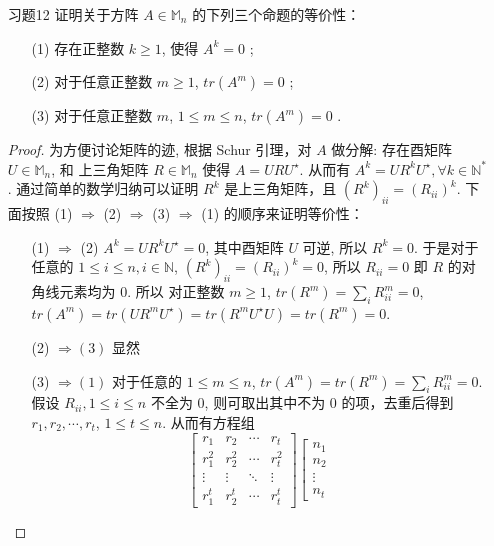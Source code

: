 \documentclass{article}
\begin{document}
\begin{spacing}{1.5}
\begin{enumerate}
\begin{itemize}
    \end{itemize}

    \item [习题12] 证明关于方阵 $A\in\mathbb{M}_n$ 的下列三个命题的等价性：
    \begin{itemize}
        \item [(1)] 存在正整数 $k \geq 1$, 使得 $A^k = 0$ ;
        \item [(2)] 对于任意正整数 $m\geq 1$, $tr(A^m) = 0$ ;
        \item [(3)] 对于任意正整数 $m$, $1\leq m \leq n$, $tr(A^m) = 0$ .
    \end{itemize}
    \begin{proof}
        为方便讨论矩阵的迹, 根据 Schur 引理，对 $A$ 做分解: 存在酉矩阵 $U\in\mathbb{M}_n$, 和 上三角矩阵 $R\in\mathbb{M}_n$ 使得 $A = URU^\star$. 从而有 $A^k = UR^kU^\star, \forall k\in\mathbb{N}^*$. 通过简单的数学归纳可以证明 $R^k$ 是上三角矩阵，且 $(R^k)_{ii} = (R_{ii})^k$. 下面按照 (1) $\Rightarrow $ (2) $\Rightarrow $ (3) $\Rightarrow$ (1) 的顺序来证明等价性：
        \begin{itemize}
            \item [(1) $\Rightarrow$ (2)] $A^k = UR^kU^\star = 0$, 其中酉矩阵 $U$ 可逆, 所以 $R^k = 0$. 于是对于任意的 $1\leq i\leq n, i\in\mathbb{N}$, $(R^k)_{ii} = (R_{ii})^k = 0$, 所以 $R_{ii} = 0$ 即 $R$ 的对角线元素均为 $0$. 所以 对正整数 $m\geq 1$, $tr(R^m) = \sum_i R_{ii}^m = 0$, $tr(A^m) = tr(UR^mU^\star) = tr(R^mU^\star U) = tr(R^m) = 0$.
            \item [(2) $\Rightarrow (3)$] 显然
            \item [(3) $\Rightarrow (1)$] 对于任意的 $1\leq m\leq n$, $tr(A^m) = tr(R^m) = \sum_{i} R_{ii}^m = 0$. 假设 $R_{ii}, 1\leq i\leq n$ 不全为 $0$, 则可取出其中不为 $0$ 的项，去重后得到 $r_1, r_2, \cdots, r_t$, $1\leq t \leq n$. 从而有方程组
            $$\left[\begin{array}{cccc}
                r_1 & r_2 & \cdots & r_t\\
                r_1^2 & r_2^2 & \cdots & r_t^2\\
                \vdots & \vdots & \ddots & \vdots\\
                r_1^{t} & r_2^{t} & \cdots & r_t^{t} 
            \end{array}\right]
            \left[\begin{array}{c}
                n_1 \\ n_2 \\ \vdots \\ n_t

\end{array}$$
\end{itemize}
\end{proof}
\end{enumerate}
\end{spacing}
\end{document}
